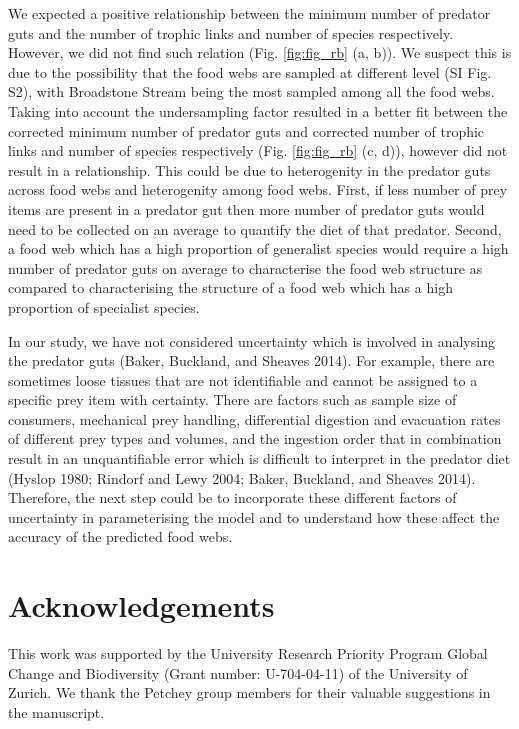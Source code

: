 \documentclass{article}
\begin{document}
We expected a positive relationship between the minimum number of
predator guts and the number of trophic links and number of species
respectively. However, we did not find such relation (Fig.
\ref{fig:fig_rb} (a, b)). We suspect this is due to the possibility that
the food webs are sampled at different level (SI Fig. S2), with
Broadstone Stream being the most sampled among all the food webs. Taking
into account the undersampling factor resulted in a better fit between
the corrected minimum number of predator guts and corrected number of
trophic links and number of species respectively (Fig. \ref{fig:fig_rb}
(c, d)), however did not result in a relationship. This could be due to
heterogenity in the predator guts across food webs and heterogenity
among food webs. First, if less number of prey items are present in a
predator gut then more number of predator guts would need to be
collected on an average to quantify the diet of that predator. Second, a
food web which has a high proportion of generalist species would require
a high number of predator guts on average to characterise the food web
structure as compared to characterising the structure of a food web
which has a high proportion of specialist species.

In our study, we have not considered uncertainty which is involved in
analysing the predator guts (Baker, Buckland, and Sheaves 2014). For
example, there are sometimes loose tissues that are not identifiable and
cannot be assigned to a specific prey item with certainty. There are
factors such as sample size of consumers, mechanical prey handling,
differential digestion and evacuation rates of different prey types and
volumes, and the ingestion order that in combination result in an
unquantifiable error which is difficult to interpret in the predator
diet (Hyslop 1980; Rindorf and Lewy 2004; Baker, Buckland, and Sheaves
2014). Therefore, the next step could be to incorporate these different
factors of uncertainty in parameterising the model and to understand how
these affect the accuracy of the predicted food webs.

\hypertarget{acknowledgements}{%
\section{Acknowledgements}\label{acknowledgements}}

This work was supported by the University Research Priority Program
Global Change and Biodiversity (Grant number: U-704-04-11) of the
University of Zurich. We thank the Petchey group members for their
valuable suggestions in the manuscript.
\end{document}
